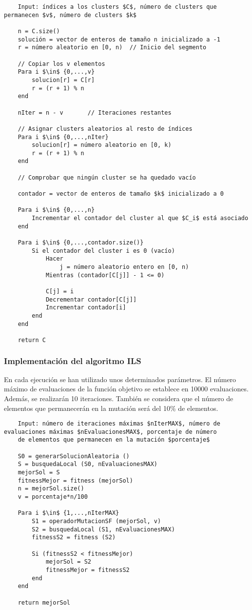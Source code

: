 	\footnotesize
	\begin{lstlisting}
	Input: índices a los clusters $C$, número de clusters que permanecen $v$, número de clusters $k$

	n = C.size()
	solución = vector de enteros de tamaño n inicializado a -1
	r = número aleatorio en [0, n)	// Inicio del segmento
	
	// Copiar los v elementos
	Para i $\in$ {0,...,v}
		solucion[r] = C[r]
		r = (r + 1) % n
	end 

	nIter = n - v		// Iteraciones restantes 

	// Asignar clusters aleatorios al resto de índices 
	Para i $\in$ {0,...,nIter}
		solucion[r] = número aleatorio en [0, k)
		r = (r + 1) % n
	end 

	// Comprobar que ningún cluster se ha quedado vacío

	contador = vector de enteros de tamaño $k$ inicializado a 0
			
	Para i $\in$ {0,...,n}
		Incrementar el contador del cluster al que $C_i$ está asociado
	end
			
	Para i $\in$ {0,...,contador.size()}
		Si el contador del cluster i es 0 (vacío)
			Hacer 
				j = número aleatorio entero en [0, n)
			Mientras (contador[C[j]] - 1 <= 0)

			C[j] = i
			Decrementar contador[C[j]]
			Incrementar contador[i]
		end
	end
	
	return C
	\end{lstlisting}
	\normalsize

	\subsubsection{Implementación del algoritmo ILS}

	En cada ejecución se han utilizado unos determinados parámetros. El número máximo de 
	evaluaciones de la función objetivo se establece en 10000 evaluaciones. Además, se realizarán 
	10 iteraciones. También se considera que el número de elementos que permanecerán en la mutación será 
	del 10\% de elementos.

	\footnotesize
	\begin{lstlisting}
	Input: número de iteraciones máximas $nIterMAX$, número de evaluaciones máximas $nEvaluacionesMAX$, porcentaje de número 
	de elementos que permanecen en la mutación $porcentaje$

	S0 = generarSolucionAleatoria ()
	S = busquedaLocal (S0, nEvaluacionesMAX)
	mejorSol = S 
	fitnessMejor = fitness (mejorSol)
	n = mejorSol.size()
	v = porcentaje*n/100

	Para i $\in$ {1,...,nIterMAX}
		S1 = operadorMutacionSF (mejorSol, v)
		S2 = busquedaLocal (S1, nEvaluacionesMAX)
		fitnessS2 = fitness (S2)

		Si (fitnessS2 < fitnessMejor)
			mejorSol = S2
			fitnessMejor = fitnessS2 
		end 
	end
		
	return mejorSol 
	\end{lstlisting}
	\normalsize

